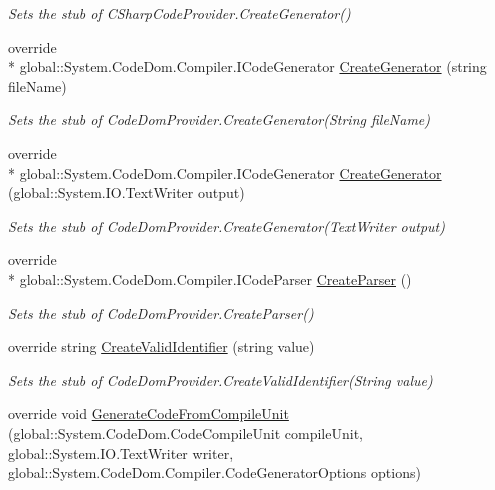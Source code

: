 \begin{DoxyCompactItemize}
\begin{DoxyCompactList}\small\item\em Sets the stub of C\-Sharp\-Code\-Provider.\-Create\-Generator()\end{DoxyCompactList}\item 
override \\*
global\-::\-System.\-Code\-Dom.\-Compiler.\-I\-Code\-Generator \hyperlink{class_microsoft_1_1_c_sharp_1_1_fakes_1_1_stub_c_sharp_code_provider_a48757477dc8fe81e342e148275b7dcc2}{Create\-Generator} (string file\-Name)
\begin{DoxyCompactList}\small\item\em Sets the stub of Code\-Dom\-Provider.\-Create\-Generator(\-String file\-Name)\end{DoxyCompactList}\item 
override \\*
global\-::\-System.\-Code\-Dom.\-Compiler.\-I\-Code\-Generator \hyperlink{class_microsoft_1_1_c_sharp_1_1_fakes_1_1_stub_c_sharp_code_provider_a757cbccd66a95dba5321213bb15e2b0c}{Create\-Generator} (global\-::\-System.\-I\-O.\-Text\-Writer output)
\begin{DoxyCompactList}\small\item\em Sets the stub of Code\-Dom\-Provider.\-Create\-Generator(\-Text\-Writer output)\end{DoxyCompactList}\item 
override \\*
global\-::\-System.\-Code\-Dom.\-Compiler.\-I\-Code\-Parser \hyperlink{class_microsoft_1_1_c_sharp_1_1_fakes_1_1_stub_c_sharp_code_provider_a63a29f3bac48245d2a5ca49ee73d6102}{Create\-Parser} ()
\begin{DoxyCompactList}\small\item\em Sets the stub of Code\-Dom\-Provider.\-Create\-Parser()\end{DoxyCompactList}\item 
override string \hyperlink{class_microsoft_1_1_c_sharp_1_1_fakes_1_1_stub_c_sharp_code_provider_a2f94ab970a0cfda7c1996abced1912be}{Create\-Valid\-Identifier} (string value)
\begin{DoxyCompactList}\small\item\em Sets the stub of Code\-Dom\-Provider.\-Create\-Valid\-Identifier(\-String value)\end{DoxyCompactList}\item 
override void \hyperlink{class_microsoft_1_1_c_sharp_1_1_fakes_1_1_stub_c_sharp_code_provider_ae1dcec9a92ca234ba061a96280a6e6b5}{Generate\-Code\-From\-Compile\-Unit} (global\-::\-System.\-Code\-Dom.\-Code\-Compile\-Unit compile\-Unit, global\-::\-System.\-I\-O.\-Text\-Writer writer, global\-::\-System.\-Code\-Dom.\-Compiler.\-Code\-Generator\-Options options)

\end{DoxyCompactItemize}
